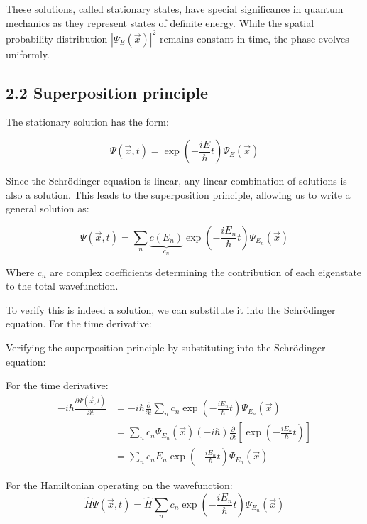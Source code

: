 \documentclass[italian]{HKNdocument}
\begin{document}
These solutions, called stationary states, have special significance in quantum mechanics as they represent states of definite energy. While the spatial probability distribution $|\Psi_E(\vec{x})|^2$ remains constant in time, the phase evolves uniformly.

\subsection*{2.2 Superposition principle}

The stationary solution has the form:

\begin{equation*}
\Psi(\vec{x}, t) = \exp\left(-\frac{iE}{\hbar}t\right)\Psi_E(\vec{x}) \tag{2.5}
\end{equation*}

Since the Schrödinger equation is linear, any linear combination of solutions is also a solution. This leads to the superposition principle, allowing us to write a general solution as:

\begin{equation*}
\Psi(\vec{x}, t) = \sum_n \underbrace{c(E_n)}_{c_n}\exp\left(-\frac{iE_n}{\hbar}t\right)\Psi_{E_n}(\vec{x}) \tag{2.6}
\end{equation*}

Where $c_n$ are complex coefficients determining the contribution of each eigenstate to the total wavefunction.

To verify this is indeed a solution, we can substitute it into the Schrödinger equation. For the time derivative:


Verifying the superposition principle by substituting into the Schrödinger equation:

For the time derivative:
\begin{align*}
-i\hbar\frac{\partial\Psi(\vec{x},t)}{\partial t} &= -i\hbar\frac{\partial}{\partial t}\sum_n c_n\exp\left(-\frac{iE_n}{\hbar}t\right)\Psi_{E_n}(\vec{x}) \\
&= \sum_n c_n\Psi_{E_n}(\vec{x})(-i\hbar)\frac{\partial}{\partial t}\left[\exp\left(-\frac{iE_n}{\hbar}t\right)\right] \tag{2.7} \\
&= \sum_n c_nE_n\exp\left(-\frac{iE_n}{\hbar}t\right)\Psi_{E_n}(\vec{x})
\end{align*}

For the Hamiltonian operating on the wavefunction:
\begin{equation*}
\hat{H}\Psi(\vec{x},t) = \hat{H}\sum_n c_n\exp\left(-\frac{iE_n}{\hbar}t\right)\Psi_{E_n}(\vec{x}) \tag{2.8}
\end{equation*}
\end{document}
